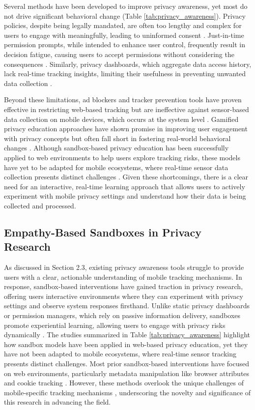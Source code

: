\documentclass[acmlarge, nonacm]{acmart}
\begin{document}
Several methods have been developed to improve privacy awareness, yet most do not drive significant behavioral change (Table \ref{tab:privacy_awareness}). Privacy policies, despite being legally mandated, are often too lengthy and complex for users to engage with meaningfully, leading to uninformed consent \cite{burkhardt2023privacy}. Just-in-time permission prompts, while intended to enhance user control, frequently result in decision fatigue, causing users to accept permissions without considering the consequences \cite{bilogrevic2021shhh}. Similarly, privacy dashboards, which aggregate data access history, lack real-time tracking insights, limiting their usefulness in preventing unwanted data collection \cite{narayanan2024real}.

Beyond these limitations, ad blockers and tracker prevention tools have proven effective in restricting web-based tracking but are ineffective against sensor-based data collection on mobile devices, which occurs at the system level \cite{bian2021supply}. Gamified privacy education approaches have shown promise in improving user engagement with privacy concepts but often fall short in fostering real-world behavioral changes \cite{idierukevbe2024bridging}. Although sandbox-based privacy education has been successfully applied to web environments to help users explore tracking risks, these models have yet to be adapted for mobile ecosystems, where real-time sensor data collection presents distinct challenges \cite{Chaoran2023EmpathySandbox}. Given these shortcomings, there is a clear need for an interactive, real-time learning approach that allows users to actively experiment with mobile privacy settings and understand how their data is being collected and processed.

\subsection{Empathy-Based Sandboxes in Privacy Research}
As discussed in Section 2.3, existing privacy awareness tools struggle to provide users with a clear, actionable understanding of mobile tracking mechanisms. In response, sandbox-based interventions have gained traction in privacy research, offering users interactive environments where they can experiment with privacy settings and observe system responses firsthand. Unlike static privacy dashboards or permission managers, which rely on passive information delivery, sandboxes promote experiential learning, allowing users to engage with privacy risks dynamically \cite{Chaoran2023EmpathySandbox}. The studies summarized in Table \ref{tab:privacy_awareness} highlight how sandbox models have been applied in web-based privacy education, yet they have not been adapted to mobile ecosystems, where real-time sensor tracking presents distinct challenges. Most prior sandbox-based interventions have focused on web environments, particularly metadata manipulation like browser attributes and cookie tracking \cite{van2024we}. However, these methods overlook the unique challenges of mobile-specific tracking mechanisms \cite{bella}, underscoring the novelty and significance of this research in advancing the field.
\end{document}
